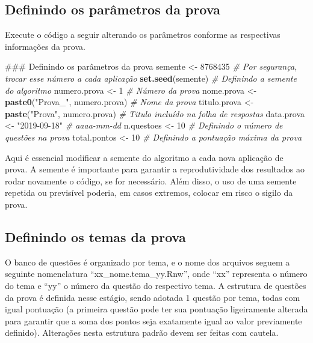 \documentclass[a4paper]{report}
\newenvironment{Shaded}{\begin{snugshade}}{\end{snugshade}}
\newcommand{\KeywordTok}[1]{\textcolor[rgb]{0.13,0.29,0.53}{\textbf{#1}}}
\newcommand{\DecValTok}[1]{\textcolor[rgb]{0.00,0.00,0.81}{#1}}
\newcommand{\StringTok}[1]{\textcolor[rgb]{0.31,0.60,0.02}{#1}}
\newcommand{\CommentTok}[1]{\textcolor[rgb]{0.56,0.35,0.01}{\textit{#1}}}
\newcommand{\NormalTok}[1]{#1}
\begin{document}
\subsection{Definindo os parâmetros da prova}

Execute o código a seguir alterando os parâmetros conforme as
respectivas informações da prova.

\begin{Shaded}
\begin{Highlighting}[]
\NormalTok{### Definindo os parâmetros da prova}
\NormalTok{semente <-}\StringTok{ }\DecValTok{8768435}  \CommentTok{# Por segurança, trocar esse número a cada aplicação}
\KeywordTok{set.seed}\NormalTok{(semente)  }\CommentTok{# Definindo a semente do algoritmo}
\NormalTok{numero.prova <-}\StringTok{ }\DecValTok{1}  \CommentTok{# Número da prova}
\NormalTok{nome.prova <-}\StringTok{ }\KeywordTok{paste0}\NormalTok{(}\StringTok{"Prova_"}\NormalTok{, numero.prova)  }\CommentTok{# Nome da prova}
\NormalTok{titulo.prova <-}\StringTok{ }\KeywordTok{paste}\NormalTok{(}\StringTok{"Prova"}\NormalTok{, numero.prova)  }\CommentTok{# Titulo incluído na folha de respostas}
\NormalTok{data.prova <-}\StringTok{ "2019-09-18"}  \CommentTok{# aaaa-mm-dd}
\NormalTok{n.questoes <-}\StringTok{ }\DecValTok{10}  \CommentTok{# Definindo o número de questões na prova }
\NormalTok{total.pontos <-}\StringTok{ }\DecValTok{10}   \CommentTok{# Definindo a pontuação máxima da prova}
\end{Highlighting}
\end{Shaded}

Aqui é essencial modificar a semente do algoritmo a cada nova aplicação
de prova. A semente é importante para garantir a reprodutividade dos
resultados ao rodar novamente o código, se for necessário. Além disso, o
uso de uma semente repetida ou previsível poderia, em casos extremos,
colocar em risco o sigilo da prova.

\subsection{Definindo os temas da prova}

O banco de questões é organizado por tema, e o nome dos arquivos seguem
a seguinte nomenclatura ``xx\_nome.tema\_yy.Rnw'', onde ``xx''
representa o número do tema e ``yy'' o número da questão do respectivo
tema. A estrutura de questões da prova é definida nesse estágio, sendo
adotada 1 questão por tema, todas com igual pontuação (a primeira
questão pode ter sua pontuação ligeiramente alterada para garantir que a
soma dos pontos seja exatamente igual ao valor previamente definido).
Alterações nesta estrutura padrão devem ser feitas com cautela.
\end{document}
